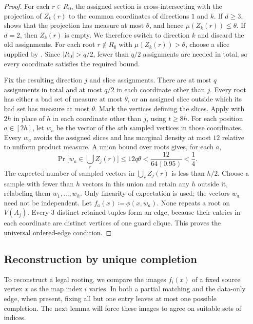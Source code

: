 \documentclass[10pt]{article}
\numberwithin{equation}{section}
\theoremstyle{definition}
\begin{document}
\begin{proof}
For each $r\in R_0$, the assigned section is cross-intersecting with the projection of $Z_k(r)$ to the common coordinates of directions $1$ and $k$. If $d\ge3$,  shows that the projection has measure at most $\theta$, and hence $\mu(Z_k(r))\le\theta$. If $d=2$, then $Z_k(r)$ is empty. We therefore switch to direction $k$ and discard the old assignments. For each root $r\notin R_0$ with $\mu(Z_k(r))>\theta$, choose a slice supplied by . Since $|R_0|>q/2$, fewer than $q/2$ assignments are needed in total, so every coordinate satisfies the required bound.

Fix the resulting direction $j$ and slice assignments. There are at most $q$ assignments in total and at most $q/2$ in each coordinate other than $j$. Every root has either a bad set of measure at most $\theta$, or an assigned slice outside which its bad set has measure at most $\theta$. Mark the vertices defining the slices. Apply  with $2h$ in place of $h$ in each coordinate other than $j$, using $t\ge8h$. For each position $a\in[2h]$, let $w_a$ be the vector of the $a$th sampled vertices in those coordinates. Every $w_a$ avoids the assigned slices and has marginal density at most $12$ relative to uniform product measure. A union bound over roots gives, for each $a$,
\[
 \Pr\bigl[w_a\in\textstyle\bigcup_r Z_j(r)\bigr]
 \le12q\theta<\frac{12}{64(0.95)}<\frac14.
\]
The expected number of sampled vectors in $\bigcup_r Z_j(r)$ is less than $h/2$. Choose a sample with fewer than $h$ vectors in this union and retain any $h$ outside it, relabeling them $w_1,\ldots,w_h$. Only linearity of expectation is used; the vectors $w_a$ need not be independent. Let $f_a(x)\coloneqq\phi(x,w_a)$. None repeats a root on $V(A_j)$. Every 3 distinct retained tuples form an edge, because their entries in each coordinate are distinct vertices of one guard clique. This proves the universal ordered-edge condition.
\end{proof}

\subsection{Reconstruction by unique completion}
To reconstruct a legal rooting, we compare the images $f_i(x)$ of a fixed source vertex $x$ as the map index $i$ varies. In both a partial matching and the data-only edge, when present, fixing all but one entry leaves at most one possible completion. The next lemma will force these images to agree on suitable sets of indices.
\end{document}
